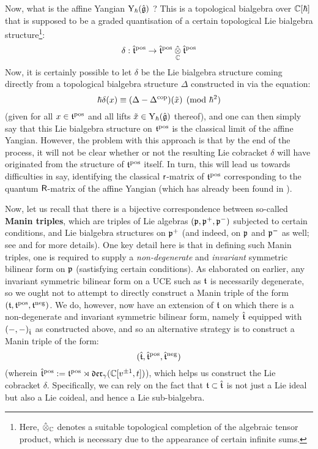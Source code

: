         Now, what is the affine Yangian $\mathrm{Y}_{\hbar}(\hat{\mathfrak{g}})$ ? This is a topological bialgebra over $\mathbb{C}[\hbar]$ that is supposed to be a graded quantisation of a certain topological Lie bialgebra structure\footnote{Here, $\hattensor_{\bbC}$ denotes a suitable topological completion of the algebraic tensor product, which is necessary due to the appearance of certain infinite sums.}:
            $$\delta: \extendedtoroidal^{\positive} \to \extendedtoroidal^{\positive} \hattensor_{\bbC} \extendedtoroidal^{\positive}$$
        Now, it is certainly possible to let $\delta$ be the Lie bialgebra structure coming directly from a topological bialgebra structure $\Delta$ constructed in \cite{guay_nakajima_wendlandt_affine_yangian_coproduct} via the equation:
            $$\hbar\delta(x) \equiv (\Delta - \Delta^{\mathrm{cop}})(\tilde{x}) \pmod{\hbar^2}$$
        (given for all $x \in \mathfrak{t}^{\mathrm{pos}}$ and all lifts $\tilde{x} \in \mathrm{Y}_{\hbar}(\hat{\mathfrak{g}})$ thereof), and one can then simply say that this Lie bialgebra structure on $\mathfrak{t}^{\mathrm{pos}}$ is the classical limit of the affine Yangian. However, the problem with this approach is that by the end of the process, it will not be clear whether or not the resulting Lie cobracket $\delta$ will have originated from the structure of $\mathfrak{t}^{\mathrm{pos}}$ itself. In turn, this will lead us towards difficulties in say, identifying the classical $\mathsf{r}$-matrix of $\mathfrak{t}^{\mathrm{pos}}$ corresponding to the quantum $\mathsf{R}$-matrix of the affine Yangian (which has already been found in \cite{appel_gautam_wendlandt_R_matrices_of_affine_yangians}).
        
        Now, let us recall that there is a bijective correspondence between so-called \textbf{Manin triples}, which are triples of Lie algebras $(\mathfrak{p}, \mathfrak{p}^+, \mathfrak{p}^-)$ subjected to certain conditions, and Lie bialgebra structures on $\mathfrak{p}^+$ (and indeed, on $\mathfrak{p}$ and $\mathfrak{p}^-$ as well; see \cite[Subsections 1.2 and 7.4]{etingof_kazhdan_quantisation_1} and \cite[Section 6.1]{etingof_schiffmann_lectures_on_quantum_groups} for more details). One key detail here is that in defining such Manin triples, one is required to supply a \textit{non-degenerate} and \textit{invariant} symmetric bilinear form on $\mathfrak{p}$ (sastisfying certain conditions). As elaborated on earlier, any invariant symmetric bilinear form on a UCE such as $\mathfrak{t}$ is necessarily degenerate, so we ought not to attempt to directly construct a Manin triple of the form $(\mathfrak{t}, \mathfrak{t}^{\mathrm{pos}}, \mathfrak{t}^{\mathrm{neg}})$. We do, however, now have an extension of $\mathfrak{t}$ on which there is a non-degenerate and invariant symmetric bilinear form, namely $\hat{\mathfrak{t}}$ equipped with $(-, -)_{\hat{\mathfrak{t}}}$ as constructed above, and so an alternative strategy is to construct a Manin triple of the form:
            $$(\hat{\mathfrak{t}}, \hat{\mathfrak{t}}^{\mathrm{pos}}, \hat{\mathfrak{t}}^{\mathrm{neg}})$$
        (wherein $\hat{\mathfrak{t}}^{\mathrm{pos}} := \mathfrak{t}^{\mathrm{pos}} \rtimes \mathfrak{der}_{\gamma}(\mathbb{C}[v^{\pm 1}, t])$), which helps us construct the Lie cobracket $\delta$. Specifically, we can rely on the fact that $\mathfrak{t} \subset \hat{\mathfrak{t}}$ is not just a Lie ideal but also a Lie coideal, and hence a Lie sub-bialgebra. 


